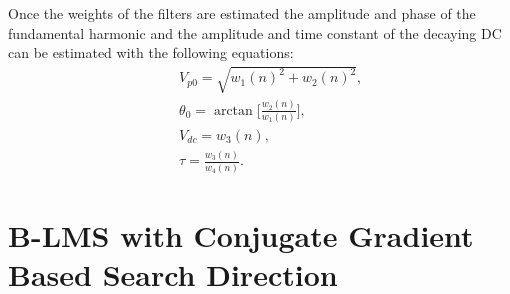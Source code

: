 \documentclass{UCF_ETD}
\begin{document}
Once the weights of the filters are estimated the amplitude and phase of the fundamental harmonic and the amplitude and time constant of the decaying DC can be estimated with the following equations:
\begin{eqnarray*}
&&V_{p0} = \sqrt{w_1(n)^2+w_2(n)^2},   \\
&&\theta_0 =\arctan \Big[ \frac{w_2(n)}{w_1(n)} \Big], \\
&&V_{dc}= w_3(n),  \\
&&\tau = \frac{w_3(n)}{w_4(n)}.  
\end{eqnarray*}

\section{B-LMS with Conjugate Gradient Based Search Direction} \label{B_LMS} 
\end{document}

